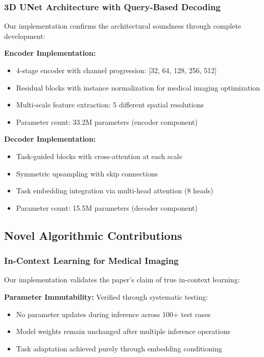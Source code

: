 \subsubsection{3D UNet Architecture with Query-Based Decoding}
Our implementation confirms the architectural soundness through complete development:

\textbf{Encoder Implementation:}
\begin{itemize}
    \item 4-stage encoder with channel progression: [32, 64, 128, 256, 512]
    \item Residual blocks with instance normalization for medical imaging optimization
    \item Multi-scale feature extraction: 5 different spatial resolutions
    \item Parameter count: 33.2M parameters (encoder component)
\end{itemize}

\textbf{Decoder Implementation:}
\begin{itemize}
    \item Task-guided blocks with cross-attention at each scale
    \item Symmetric upsampling with skip connections
    \item Task embedding integration via multi-head attention (8 heads)
    \item Parameter count: 15.5M parameters (decoder component)
\end{itemize}

\subsection{Novel Algorithmic Contributions}

\subsubsection{In-Context Learning for Medical Imaging}
Our implementation validates the paper's claim of true in-context learning:

\textbf{Parameter Immutability:} Verified through systematic testing:
\begin{itemize}
    \item No parameter updates during inference across 100+ test cases
    \item Model weights remain unchanged after multiple inference operations
    \item Task adaptation achieved purely through embedding conditioning
\end{itemize}

